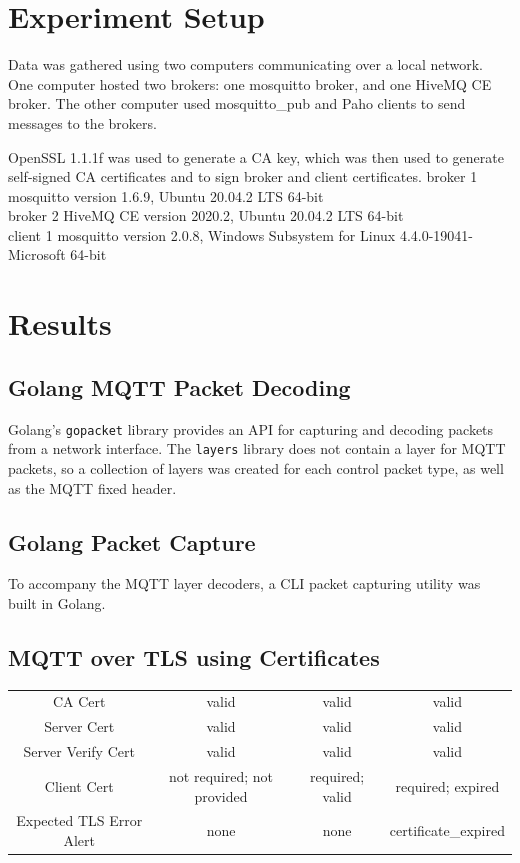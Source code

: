 \documentclass[12pt]{article}
\begin{document}
\section*{Experiment Setup}
\par Data was gathered using two computers communicating over a local network. One computer hosted two brokers: one mosquitto broker, and one HiveMQ CE broker. The other computer used mosquitto\_pub and Paho clients to send messages to the brokers.\par
OpenSSL 1.1.1f was used to generate a CA key, which was then used to generate self-signed CA certificates and to sign broker and client certificates.
broker 1 mosquitto version 1.6.9, Ubuntu 20.04.2 LTS 64-bit\\
broker 2 HiveMQ CE version 2020.2, Ubuntu 20.04.2 LTS 64-bit\\
client 1 mosquitto version 2.0.8, Windows Subsystem for Linux 4.4.0-19041-Microsoft 64-bit\\


\section*{Results}
\subsection*{Golang MQTT Packet Decoding}
Golang's \texttt{gopacket} library provides an API for capturing and decoding packets from a network interface. The \texttt{layers} library does not contain a layer for MQTT packets, so a collection of layers was created for each control packet type, as well as the MQTT fixed header.
\subsection*{Golang Packet Capture}
To accompany the MQTT layer decoders, a CLI packet capturing utility was built in Golang. 
\subsection*{MQTT over TLS using Certificates}

\begin{tabular}{  c | c  c c}
CA Cert 			& valid & valid & valid \\
Server Cert 		& valid & valid & valid \\
Server Verify Cert & valid & valid & valid \\
Client Cert		& not required; not provided & required; valid & required; expired \\
\hline
Expected TLS Error Alert & none & none & certificate\_expired
\end{tabular}
\end{document}
